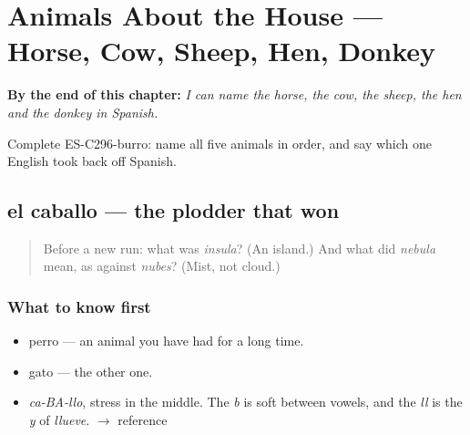 
\chapter{Animals About the House --- Horse, Cow, Sheep, Hen, Donkey}
\label{ch:animales}

\begin{chapteropening}
\textbf{By the end of this chapter:} \emph{I can name the horse, the cow, the sheep, the hen and the donkey in Spanish.}

Complete ES-C296-burro: name all five animals in order, and say which one English took back off Spanish.
\end{chapteropening}

\section[el caballo]{el caballo — the plodder that won}

\label{lesson:ES-C296-caballo}



\begin{quote}
Before a new run: what was \emph{insula}? (An island.) And what did \emph{nebula} mean, as against \emph{nubes}? (Mist, not cloud.)
\end{quote}

\subsection*{What to know first}
\begin{itemize}
\raggedright
  \item perro — an animal you have had for a long time.
  \item gato — the other one.
\end{itemize}

\begin{sounds}
\begin{itemize}
\raggedright
  \item \emph{ca-BA-llo}, stress in the middle. The \emph{b} is soft between vowels, and the \emph{ll} is the \emph{y} of \emph{llueve}. $\to$ reference
\end{itemize}
\end{sounds}

